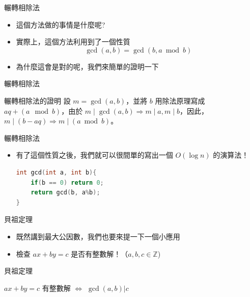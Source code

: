 \documentclass[aspectratio=169]{beamer}
\begin{document}
    \begin{frame}{輾轉相除法}
        \begin{itemize}
            \item 這個方法做的事情是什麼呢?
            \item 實際上，這個方法利用到了一個性質
            $$\gcd(a,b) = \gcd(b, a \bmod b)$$
            \item 為什麼這會是對的呢，我們來簡單的證明一下
        \end{itemize}
    \end{frame}
    
    \begin{frame}{輾轉相除法}
        \begin{block}{輾轉相除法的證明}
            設 $m = \gcd(a,b)$，並將 $b$ 用除法原理寫成 $aq + (a\mod b)$，由於 $m \mid \gcd(a,b) \Rightarrow m \mid a, m \mid b$，因此，$m \mid (b-aq) \Rightarrow m \mid (a \bmod b)$。
        \end{block}
    \end{frame}
    
    \begin{frame}[fragile]{輾轉相除法}
        \begin{itemize}
            \item 有了這個性質之後，我們就可以很間單的寫出一個 $O(\log n)$ 的演算法！
            \begin{lstlisting}[language=C++,basicstyle=\ttfamily \small]
int gcd(int a, int b){
    if(b == 0) return 0;
    return gcd(b, a%b);
}
            \end{lstlisting}
        \end{itemize}
    \end{frame}
    
    \begin{frame}{貝祖定理}
        \begin{itemize}
            \item 既然講到最大公因數，我們也要來提一下一個小應用
            \item 檢查 $ax+by=c$ 是否有整數解！（$a,b,c \in \mathbb{Z}$)
        \end{itemize}
        \begin{block}{貝祖定理}
            \begin{center}
                $ax+by=c$ 有整數解 $\iff$ $\gcd(a,b) | c$
            \end{center}
        \end{block}
    \end{frame}
    
\end{document}
